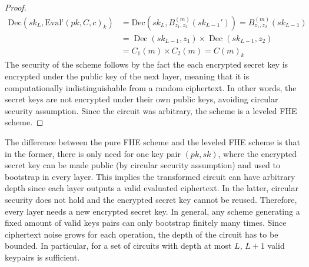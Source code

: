 \begin{proof}
\begin{equation*}
    \begin{aligned}
    \text{Dec}(sk_L, \text{Eval'}(pk, C, c)_k) &= \text{Dec}(sk_L, B_{z_1,z_2}^{(m)}(sk_{L-1}')) = B_{z_1,z_2}^{(m)}(sk_{L-1}) \\
    &= \operatorname{Dec}(sk_{L-1}, z_1) \times \operatorname{Dec}(sk_{L-1}, z_2) \\
    &= C_1(m) \times C_2(m) = C(m)_k
    \end{aligned}
\end{equation*}
The security of the scheme follows by the fact the each encrypted secret key is encrypted under the public key of the next layer, meaning that it is computationally indistinguishable from a random ciphertext. In other words, the secret keys are not encrypted under their own public keys, avoiding circular security assumption. Since the circuit was arbitrary, the scheme is a leveled FHE scheme.
\end{proof}

The difference between the pure FHE scheme and the leveled FHE scheme is that in the former, there is only need for one key pair $(pk,sk)$, where the encrypted secret key can be made public (by circular security assumption) and used to bootstrap in every layer. This implies the transformed circuit can have arbitrary depth since each layer outputs a valid evaluated ciphertext. In the latter, circular security does not hold and the encrypted secret key cannot be reused. Therefore, every layer needs a new encrypted secret key. In general, any scheme generating a fixed amount of valid keys pairs can only bootstrap finitely many times. Since ciphertext noise grows for each operation, the depth of the circuit has to be bounded. In particular, for a set of circuits with depth at most $L$, $L+1$ valid keypairs is sufficient.

